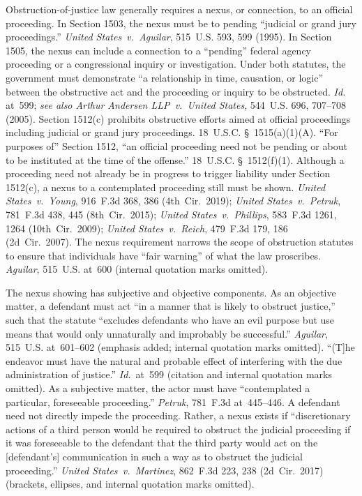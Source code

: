 Obstruction-of-justice law generally requires a nexus, or connection, to an official proceeding.
In Section 1503, the nexus must be to pending ``judicial or grand jury proceedings.''
\textit{United States~v.\ Aguilar}, 515~U.S. 593, 599 (1995).
In Section 1505, the nexus can include a connection to a ``pending'' federal agency proceeding or a congressional inquiry or investigation.
Under both statutes, the government must demonstrate ``a relationship in time, causation, or logic'' between the obstructive act and the proceeding or inquiry to be obstructed.
\textit{Id.} at~599; \textit{see also Arthur Andersen LLP~v.\ United States}, 544~U.S. 696, 707--708 (2005).
Section 1512(c) prohibits obstructive efforts aimed at official proceedings including judicial or grand jury proceedings.
18~U.S.C. \S~1515(a)(1)(A).
``For purposes of'' Section 1512, ``an official proceeding need not be pending or about to be instituted at the time of the offense.''
18~U.S.C. \S~1512(f)(1).
Although a proceeding need not already be in progress to trigger liability under Section 1512(c), a nexus to a contemplated proceeding still must be shown.
\textit{United States~v.\ Young}, 916~F.3d 368, 386 (4th~Cir.~2019);
\textit{United States~v.\ Petruk}, 781~F.3d 438, 445 (8th~Cir.~2015);
\textit{United States~v.\ Phillips}, 583~F.3d 1261, 1264 (10th~Cir.~2009);
\textit{United States~v.\ Reich}, 479~F.3d 179, 186 (2d~Cir.~2007).
The nexus requirement narrows the scope of obstruction statutes to ensure that individuals have ``fair warning'' of what the law proscribes.
\textit{Aguilar}, 515~U.S. at~600 (internal quotation marks omitted).

The nexus showing has subjective and objective components.
As an objective matter, a defendant must act ``in a manner that is likely to obstruct justice,'' such that the statute ``excludes defendants who have an evil purpose but use means that would only unnaturally and improbably be successful.''
\textit{Aguilar}, 515~U.S. at~601--602 (emphasis added; internal quotation marks omitted).
``(T]he endeavor must have the natural and probable effect of interfering with the due administration of justice.''
\textit{Id.}~at~599 (citation and internal quotation marks omitted).
As a subjective matter, the actor must have ``contemplated a particular, foreseeable proceeding.''
\textit{Petruk}, 781~F.3d at~445--446.
A defendant need not directly impede the proceeding.
Rather, a nexus exists if ``discretionary actions of a third person would be required to obstruct the judicial proceeding if it was foreseeable to the defendant that the third party would act on the [defendant's] communication in such a way as to obstruct the judicial proceeding.''
\textit{United States~v.\ Martinez}, 862~F.3d 223, 238 (2d~Cir.~2017) (brackets, ellipses, and internal quotation marks omitted).

